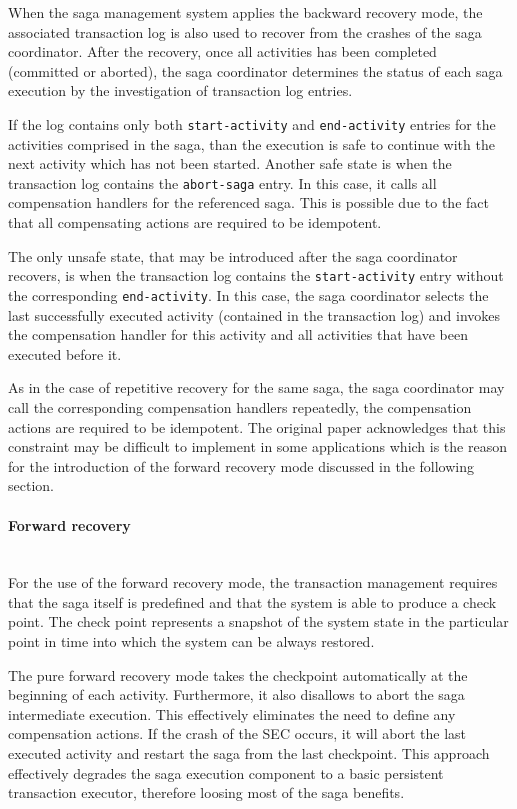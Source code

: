 \documentclass[oneside,
  digital, %
  table,   %
  nolof,     %
  nolot,     %
]{fithesis3}
\newcommand{\newlinepar}[1]{\paragraph{#1}\needspace{4\baselineskip}\mbox{}\\}
\begin{document}
When the saga management system applies the backward recovery mode, the associated transaction log is also used to recover from the crashes of the saga coordinator. After the recovery, once all activities has been completed (committed or aborted), the saga coordinator determines the status of each saga execution by the investigation of transaction log entries. 

If the log contains only both \texttt{start-activity} and \texttt{end-activity} entries for the activities comprised in the saga,  than the execution is safe to continue with the next activity which has not been started. Another safe state is when the transaction log contains the \texttt{abort-saga} entry. In this case, it calls all compensation handlers for the referenced saga. This is possible due to the fact that all compensating actions are required to be idempotent.

The only unsafe state, that may be introduced after the saga coordinator recovers, is when the transaction log contains the \texttt{start-activity} entry without the corresponding \texttt{end-activity}. In this case, the saga coordinator selects the last successfully executed activity (contained in the transaction log) and invokes the compensation handler for this activity and all activities that have been executed before it.

As in the case of repetitive recovery for the same saga, the saga coordinator may call the corresponding compensation handlers repeatedly, the compensation actions are required to be idempotent. The original paper acknowledges that this constraint may be difficult to implement in some applications which is the reason for the introduction of the forward recovery mode discussed in the following section.

\newlinepar{Forward recovery}

For the use of the forward recovery mode, the transaction management requires that the saga itself is predefined and that the system is able to produce a check point. The check point represents a snapshot of the system state in the particular point in time into which the system can be always restored.

The pure forward recovery mode takes the checkpoint automatically at the beginning of each activity. Furthermore, it also disallows to abort the saga intermediate execution. This effectively eliminates the need to define any compensation actions. If the crash of the SEC occurs, it will abort the last executed activity and restart the saga from the last checkpoint. This approach effectively degrades the saga execution component to a basic persistent transaction executor, therefore loosing most of the saga benefits.
\end{document}

